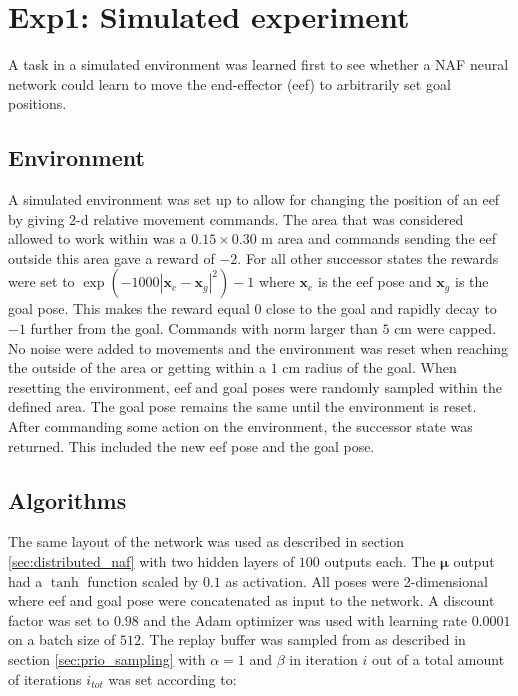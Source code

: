 \section{Exp1: Simulated experiment}

A task in a simulated environment was learned first to see whether a NAF neural
network could learn to move the end-effector (eef) to arbitrarily set goal positions.
\subsection{Environment}

A simulated environment was set up to allow for changing the position of an eef
by giving 2-d relative movement commands. The area that was considered allowed
to work within was a $0.15 \times 0.30$ m area and commands sending the eef
outside this area gave a reward of $-2$. For all other successor states the
rewards were set to $\exp\left(-1000|\mathbf{x}_e - \mathbf{x}_g|^2\right) - 1$
where $\mathbf{x}_e$ is the eef pose and $\mathbf{x}_g$ is the goal pose. This
makes the reward equal $0$ close to the goal and rapidly decay to $-1$ further
from the goal. Commands with norm larger than $5$ cm were capped. No noise were
added to movements and the environment was reset when reaching the outside of
the area or getting within a $1$ cm radius of the goal. When resetting the
environment, eef and goal poses were randomly sampled within the defined area.
The goal pose remains the same until the environment is reset. After commanding
some action on the environment, the successor state was returned. This included
the new eef pose and the goal pose.

\subsection{Algorithms}

The same layout of the network was used as described in section
\ref{sec:distributed_naf} with two hidden layers of $100$ outputs each. The
$\mathbf{\mu}$ output had a $\tanh$ function scaled by $0.1$ as activation. All
poses were 2-dimensional where eef and goal pose were concatenated as input to
the network. A discount factor was set to $0.98$ and the Adam optimizer
\cite{kingma2014adam} was used with learning rate $0.0001$ on a batch size of
$512$. The replay buffer was sampled from as described in section
\ref{sec:prio_sampling} with $\alpha = 1$ and $\beta$ in iteration $i$ out of a
total amount of iterations $i_{tot}$ was set according to:

